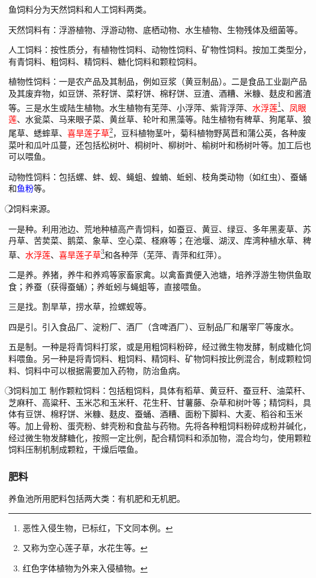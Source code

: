 \documentclass{ctexbook}
\begin{document}
鱼饲料分为天然饲料和人工饲料两类。

天然饲料有：浮游植物、浮游动物、底栖动物、水生植物、生物残体及细菌等。

人工饲料：按性质分，有植物性饲料、动物性饲料、矿物性饲料。按加工类型分，有青饲料、粗饲料、精饲料、糖化饲料和颗粒饲料。

植物性饲料：一是农产品及其制品，例如豆浆（黄豆制品）。二是食品工业副产品及其废弃物，如豆饼、茶籽饼、菜籽饼、棉籽饼、豆渣、酒糟、米糠、麸皮和酱渣等。三是水生或陆生植物。水生植物有芜萍、小浮萍、紫背浮萍、\textcolor{red}{水浮莲}\footnote{恶性入侵生物，已标红，下文同本例。}、\textcolor{red}{凤眼莲}、水瓮菜、马来眼子菜、黄丝草、轮叶和黑藻等。陆生植物有稗草、狗尾草、狼尾草、蟋蟀草、\textcolor{red}{喜旱莲子草}\footnote{又称为空心莲子草，水花生等。}，豆科植物茎叶，菊科植物野莴苣和蒲公英，各种废菜叶和瓜叶瓜蔓，还包括松树叶、桐树叶、柳树叶、榆树叶和杨树叶等。加工后也可以喂鱼。

动物性饲料：包括螺、蚌、蚬、蝇蛆、蝗蝻、蚯蚓、枝角类动物（如红虫）、蚕蛹和\textcolor{blue}{鱼粉}等。

\textcircled{2}饲料来源。

一是种。利用池边、荒地种植高产青饲料，如蚕豆、黄豆、绿豆、多年黑麦草、苏丹草、苦荬菜、鹅菜、象草、空心菜、柽麻等；在池堰、湖汊、库湾种植水草、稗草、\textcolor{red}{水浮莲}、\textcolor{red}{喜旱莲子草}\footnote{红色字体植物为外来入侵植物。}和各种萍（芜萍、青萍和红萍）。

二是养。养猪，养牛和养鸡等家畜家禽。以禽畜粪便入池塘，培养浮游生物供鱼取食；养蚕（获得蚕蛹）；养蚯蚓与蝇蛆等，直接喂鱼。

三是找。割旱草，捞水草，捡螺蚬等。

四是引。引入食品厂、淀粉厂、酒厂（含啤酒厂）、豆制品厂和屠宰厂等废水。

五是制。一种是将青饲料打浆，或是用粗饲料粉碎，经过微生物发酵，制成糖化饲料喂鱼。另一种是将青饲料、粗饲料、精饲料、矿物饲料按比例混合，制成颗粒饲料、饲料中可以根据需要加入药物，防治鱼病。

\textcircled{3}饲料加工
制作颗粒饲料：包括粗饲料，具体有稻草、黄豆秆、蚕豆秆、油菜秆、芝麻秆、高粱秆、玉米芯和玉米秆、花生秆、甘薯藤、杂草和树叶等；精饲料，具体有豆饼、棉籽饼、米糠、麸皮、蚕蛹、酒糟、面粉下脚料、大麦、稻谷和玉米等。加上骨粉、蛋壳粉、蚌壳粉和食盐与药物。先将各种粗饲料粉碎成粉并碱化，经过微生物发酵糖化，按照一定比例，配合精饲料和添加物，混合均匀，使用颗粒饲料压制机制成颗粒，干燥后喂鱼。
\subsubsection{肥料}
养鱼池所用肥料包括两大类：有机肥和无机肥。
\end{document}
